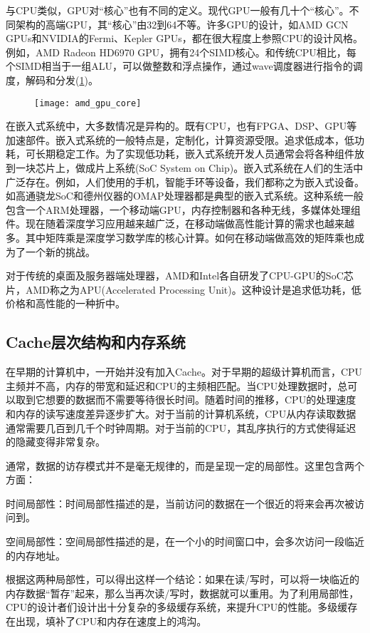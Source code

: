 与CPU类似，GPU对“核心”也有不同的定义。现代GPU一般有几十个“核心”。不同架构的高端GPU，其“核心”由32到64不等。许多GPU的设计，如AMD GCN GPUs和NVIDIA的Fermi、Kepler GPUs，都在很大程度上参照CPU的设计风格。例如，AMD Radeon HD6970 GPU，拥有24个SIMD核心。和传统CPU相比，每个SIMD相当于一组ALU，可以做整数和浮点操作，通过wave调度器进行指令的调度，解码和分发(\ref{fig:amd_gpu_core})。
\begin{figure}[htbp]
	\centering
	\texttt{[image: amd\_gpu\_core]}
	\label{fig:amd_gpu_core}
\end{figure}

在嵌入式系统中，大多数情况是异构的。既有CPU，也有FPGA、DSP、GPU等加速部件。嵌入式系统的一般特点是，定制化，计算资源受限。追求低成本，低功耗，可长期稳定工作。为了实现低功耗，嵌入式系统开发人员通常会将各种组件放到一块芯片上，做成片上系统(SoC System on Chip)。嵌入式系统在人们的生活中广泛存在。例如，人们使用的手机，智能手环等设备，我们都称之为嵌入式设备。如高通骁龙SoC和德州仪器的OMAP处理器都是典型的嵌入式系统。这种系统一般包含一个ARM处理器，一个移动端GPU，内存控制器和各种无线，多媒体处理组件。现在随着深度学习应用越来越广泛，在移动端做高性能计算的需求也越来越多。其中矩阵乘是深度学习数学库的核心计算。如何在移动端做高效的矩阵乘也成为了一个新的挑战。

对于传统的桌面及服务器端处理器，AMD和Intel各自研发了CPU-GPU的SoC芯片，AMD称之为APU(Accelerated Processing Unit)。这种设计是追求低功耗，低价格和高性能的一种折中。

\subsection{Cache层次结构和内存系统}
在早期的计算机中，一开始并没有加入Cache。对于早期的超级计算机而言，CPU主频并不高，内存的带宽和延迟和CPU的主频相匹配。当CPU处理数据时，总可以取到它想要的数据而不需要等待很长时间。随着时间的推移，CPU的处理速度和内存的读写速度差异逐步扩大。对于当前的计算机系统，CPU从内存读取数据通常需要几百到几千个时钟周期。对于当前的CPU，其乱序执行的方式使得延迟的隐藏变得非常复杂。

通常，数据的访存模式并不是毫无规律的，而是呈现一定的局部性。这里包含两个方面：

时间局部性：时间局部性描述的是，当前访问的数据在一个很近的将来会再次被访问到。

空间局部性：空间局部性描述的是，在一个小的时间窗口中，会多次访问一段临近的内存地址。

根据这两种局部性，可以得出这样一个结论：如果在读/写时，可以将一块临近的内存数据“暂存”起来，那么当再次读/写时，数据就可以重用。为了利用局部性，CPU的设计者们设计出十分复杂的多级缓存系统，来提升CPU的性能。多级缓存在出现，填补了CPU和内存在速度上的鸿沟。

